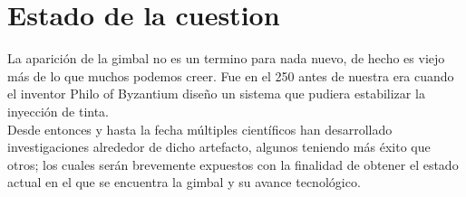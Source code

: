 \section{Estado de la cuestion}
La aparición de la gimbal no es un termino para nada nuevo, de hecho es viejo más de lo que
muchos podemos creer. Fue en el 250 antes de nuestra era cuando el inventor Philo of Byzantium diseño un sistema que pudiera estabilizar la inyección de tinta. \cite{WEB:Gimbal}\\
Desde entonces y hasta la fecha múltiples científicos han desarrollado investigaciones alrededor
de dicho artefacto, algunos teniendo más éxito que otros; los cuales serán brevemente expuestos
con la finalidad de obtener el estado actual en el que se encuentra la gimbal y su avance
tecnológico.

